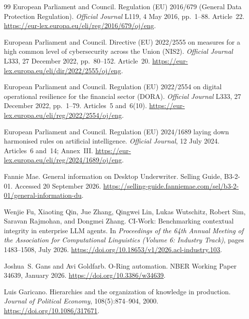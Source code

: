 \begin{thebibliography}{99}
European Parliament and Council.
\newblock Regulation (EU) 2016/679 (General Data Protection Regulation).
\newblock \emph{Official Journal} L119, 4 May 2016, pp.~1--88. Article~22.
\newblock \url{https://eur-lex.europa.eu/eli/reg/2016/679/oj/eng}.

European Parliament and Council.
\newblock Directive (EU) 2022/2555 on measures for a high common level of cybersecurity across the Union (NIS2).
\newblock \emph{Official Journal} L333, 27 December 2022, pp.~80--152. Article~20.
\newblock \url{https://eur-lex.europa.eu/eli/dir/2022/2555/oj/eng}.

European Parliament and Council.
\newblock Regulation (EU) 2022/2554 on digital operational resilience for the financial sector (DORA).
\newblock \emph{Official Journal} L333, 27 December 2022, pp.~1--79. Articles~5 and~6(10).
\newblock \url{https://eur-lex.europa.eu/eli/reg/2022/2554/oj/eng}.

European Parliament and Council.
\newblock Regulation (EU) 2024/1689 laying down harmonised rules on artificial intelligence.
\newblock \emph{Official Journal}, 12 July 2024. Articles~6 and~14; Annex~III.
\newblock \url{https://eur-lex.europa.eu/eli/reg/2024/1689/oj/eng}.

Fannie Mae.
\newblock General information on Desktop Underwriter. Selling Guide, B3-2-01.
\newblock Accessed 20 September 2026.
\newblock \url{https://selling-guide.fanniemae.com/sel/b3-2-01/general-information-du}.

Wenjie Fu, Xiaoting Qin, Jue Zhang, Qingwei Lin, Lukas Wutschitz, Robert Sim, Saravan Rajmohan, and
Dongmei Zhang.
\newblock CI-Work: Benchmarking contextual integrity in enterprise LLM agents.
\newblock In \emph{Proceedings of the 64th Annual Meeting of the Association for Computational
Linguistics (Volume 6: Industry Track)}, pages 1483--1508, July 2026.
\newblock \url{https://doi.org/10.18653/v1/2026.acl-industry.103}.

Joshua~S. Gans and Avi Goldfarb.
\newblock O-Ring automation.
\newblock NBER Working Paper 34639, January 2026.
\newblock \url{https://doi.org/10.3386/w34639}.

Luis Garicano.
\newblock Hierarchies and the organization of knowledge in production.
\newblock \emph{Journal of Political Economy}, 108(5):874--904, 2000.
\newblock \url{https://doi.org/10.1086/317671}.


\end{thebibliography}
